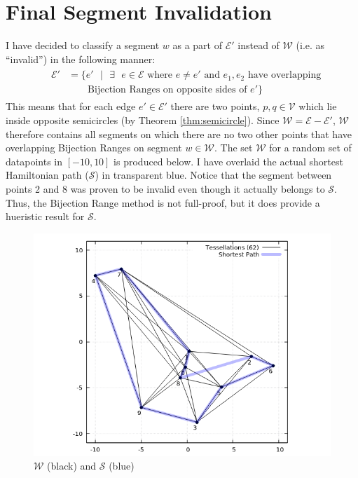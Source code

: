 \documentclass[12pt]{article}
\begin{document}
\section{Final Segment Invalidation}\label{subsec:finalinvalid}
I have decided to classify a segment $w$ as a part of $\mathcal{E}'$ instead of
$\mathcal{W}$ (i.e. as ``invalid'') in the following manner:
\begin{align*}
&\begin{aligned}
\mathcal{E}' &= \{e'\text{ }|\text{ }\exists\text{ }e \in \mathcal{E} \text{ where } e \neq e'
\text{ and } e_1,e_2 \text{ have overlapping}\\
&\qquad \text{Bijection Ranges on opposite sides of } e'\}
\end{aligned}
\end{align*}
This means that for each edge $e' \in \mathcal{E}'$ there are two points,
$p,q \in \mathcal{V}$ which lie inside opposite semicircles
(by Theorem \ref{thm:semicircle}). Since $\mathcal{W} = \mathcal{E} - \mathcal{E}'$,
$\mathcal{W}$ therefore contains all segments on which there are no
two other points that have overlapping Bijection Ranges on segment $w \in \mathcal{W}$.
The set $\mathcal{W}$ for a random set of datapoints
in $[-10, 10]$ is produced below. I have overlaid the actual shortest Hamiltonian path
($\mathcal{S}$) in transparent blue. Notice that the segment between points 2 and 8
was proven to be invalid even though it actually belongs to $\mathcal{S}$.
Thus, the Bijection Range method is not full-proof,
but it does provide a hueristic result for $\mathcal{S}$.
\begin{figure}[h!]
\begin{center}
\includegraphics{w_random}
\end{center}
\caption{$\mathcal{W}$ (black) and $\mathcal{S}$ (blue)}\label{fig:W-random}
\end{figure}
\end{document}
